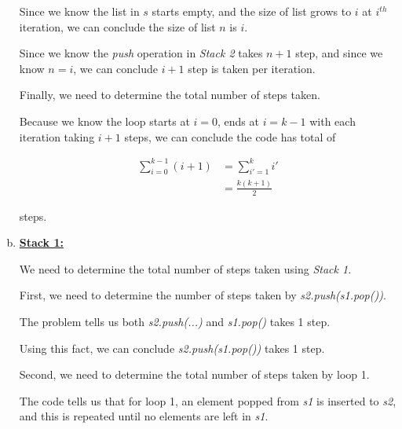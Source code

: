 \documentclass[12pt]{article}
\begin{document}
\begin{enumerate}[a.]
\begin{mdframed}
        Since we know the list in $s$ starts empty, and the size of list grows to $i$ at $i^{th}$
        iteration, we can conclude the size of list $n$ is $i$.

        \bigskip

        Since we know the \textit{push} operation in \textit{Stack 2} takes $n+1$ step,
        and since we know $n = i$, we can conclude $i+1$ step is taken per iteration.

        \bigskip

        Finally, we need to determine the total number of steps taken.

        \bigskip

        Because we know the loop starts at $i = 0$, ends at $i = k-1$ with each iteration
        taking $i+1$ steps, we can conclude the code has total of

        \setcounter{equation}{0}
        \begin{align}
            \sum\limits_{i=0}^{k-1} (i+1) &= \sum\limits_{i'=1}^k i'\\
            &= \frac{k(k+1)}{2}
        \end{align}

        steps.

    \end{mdframed}

    \item

    \underline{\textbf{Stack 1:}}

    \bigskip

    We need to determine the total number of steps taken using \textit{Stack 1}.

    \bigskip

    First, we need to determine the number of steps taken by \textit{s2.push(s1.pop())}.

    \bigskip

    The problem tells us both \textit{s2.push(...)} and \textit{s1.pop()} takes 1 step.

    \bigskip

    Using this fact, we can conclude \textit{s2.push(s1.pop())} takes 1 step.

    \bigskip

    Second, we need to determine the total number of steps taken by loop 1.

    \bigskip

    The code tells us that for loop 1, an element popped from \textit{s1} is inserted to \textit{s2},
    and this is repeated until no elements are left in \textit{s1}.


\end{enumerate}
\end{document}
